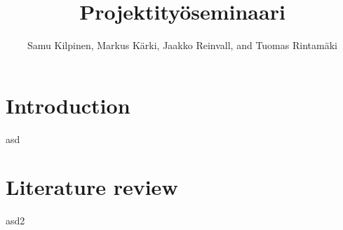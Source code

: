 \title{Projektityöseminaari}
\author{{Samu Kilpinen}, {Markus Kärki}, {Jaakko Reinvall}, and {Tuomas Rintamäki}}
\maketitle

\section{Introduction}
asd

\section{Literature review}
asd2


